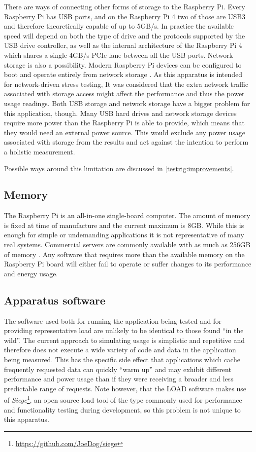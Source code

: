 There are ways of connecting other forms of storage to the Raspberry Pi. Every Raspberry Pi has USB ports, and on the Raspberry Pi 4 two of those are USB3 and therefore theoretically capable of up to 5GB/s. In practice the available speed will depend on both the type of drive and the protocols supported by the USB drive controller, as well as the internal architecture of the Raspberry Pi 4 which shares a single 4GB/s PCIe lane between all the USB ports. Network storage is also a possibility. Modern Raspberry Pi devices can be configured to boot and operate entirely from network storage \citep{RaspberryPiFoundation2023}. As this apparatus is intended for network-driven stress testing, It was considered that the extra network traffic associated with storage access might affect the performance and thus the power usage readings. Both USB storage and network storage have a bigger problem for this application, though. Many USB hard drives and network storage devices require more power than the Raspberry Pi is able to provide, which means that they would need an external power source. This would exclude any power usage associated with storage from the results and act against the intention to perform a holistic measurement.

Possible ways around this limitation are discussed in \autoref{testrig:improvements}.

\subsection{Memory}

The Raspberry Pi is an all-in-one single-board computer. The amount of memory is fixed at time of manufacture and the current maximum is 8GB. While this is enough for simple or undemanding applications it is not representative of many real systems. Commercial servers are commonly available with as much as 256GB of memory \citep{FastHosts2023}. Any software that requires more than the available memory on the Raspberry Pi board will either fail to operate or suffer changes to its performance and energy usage.

\subsection{Apparatus software}

The software used both for running the application being tested and for providing representative load are unlikely to be identical to those found \enquote{in the wild}. The current approach to simulating usage is simplistic and repetitive and therefore does not execute a wide variety of code and data in the application being measured. This has the specific side effect that applications which cache frequently requested data can quickly \enquote{warm up} and may exhibit different performance and power usage than if they were receiving a broader and less predictable range of requests. Note however, that the LOAD software makes use of \emph{Siege}\footnote{\url{https://github.com/JoeDog/siege}}, an open source load tool of the type commonly used for performance and functionality testing during development, so this problem is not unique to this apparatus.

